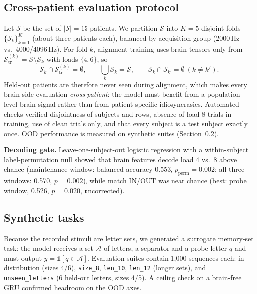 \documentclass[conference]{IEEEtran}
\begin{document}
\subsection{Cross-patient evaluation protocol}
Let $\mathcal S$ be the set of $|\mathcal S|=15$ patients. We partition $\mathcal S$ into $K=5$ disjoint folds $\{\mathcal S_k\}_{k=1}^K$ (about three patients each), balanced by acquisition group (2000\,Hz vs.\ 4000/4096\,Hz).
For fold $k$, alignment training uses brain tensors only from $\mathcal S^{(k)}_{\mathrm{tr}}=\mathcal S\setminus\mathcal S_k$ with loads $\{4,6\}$, so
\begin{equation}
  \mathcal S_k\cap\mathcal S^{(k)}_{\mathrm{tr}}=\emptyset,\qquad \bigcup_{k}\mathcal S_k=\mathcal S,\qquad \mathcal S_k\cap\mathcal S_{k'}=\emptyset\ (k\neq k').
\end{equation}
Held-out patients are therefore never seen during alignment, which makes every brain-side evaluation \emph{cross-patient}: the model must benefit from a
population-level brain signal rather than from patient-specific idiosyncrasies. Automated checks verified disjointness of subjects and rows, absence of load-8 trials in training, use of clean trials only, and that every subject is a test subject exactly once. OOD performance is measured on synthetic suites (Section~\ref{sec:synth}).

\textbf{Decoding gate.} Leave-one-subject-out logistic regression with a within-subject label-permutation
null showed that brain features decode load 4 vs.\ 8 above chance (maintenance window:
balanced accuracy 0.553, $p_{\text{perm}}=0.002$; all three windows: 0.570, $p=0.002$), while
match IN/OUT was near chance (best: probe window, 0.526, $p=0.020$, uncorrected).

\subsection{Synthetic tasks}\label{sec:synth}
Because the recorded stimuli are letter sets, we generated a surrogate memory-set task: the
model receives a set $\mathcal A$ of letters, a separator and a probe letter $q$ and must output $y=\mathbb 1[q\in\mathcal A]$. Evaluation suites contain 1{,}000 sequences each: in-distribution (sizes 4/6),
\texttt{size\_8}, \texttt{len\_10}, \texttt{len\_12} (longer sets), and \texttt{unseen\_letters}
(6 held-out letters, sizes 4/5). A ceiling check on a brain-free GRU confirmed headroom on the OOD axes.
\end{document}
